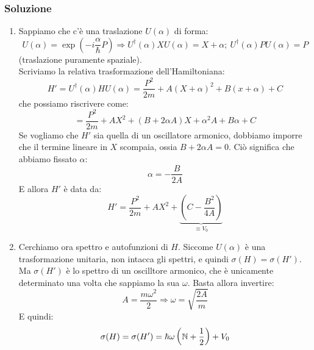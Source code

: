 \documentclass[../../FisicaTeorica.tex]{subfiles}
\begin{document}
\subsubsection{Soluzione}
\begin{enumerate}
\item Sappiamo che c'è una traslazione $U(\alpha)$ di forma:
\[
U(\alpha) =\exp\left(-i\frac{\alpha}{\hbar}P\right)\Rightarrow U^\dag (\alpha)XU(\alpha) = X+\alpha; \> U^\dag (\alpha)PU(\alpha) = P
\]
(traslazione puramente spaziale).\\
Scriviamo la relativa trasformazione dell'Hamiltoniana:
\[
H' = U^\dag(\alpha)HU(\alpha) = \frac{P^2}{2m}+ A(X+\alpha)^2 + B(x+\alpha) + C
\]
che possiamo riscrivere come:
\[
=\frac{P^2}{2m} + AX^2 + (B+2\alpha A)X + \alpha^2 A + B\alpha +C
\]
Se vogliamo che $H'$ sia quella di un oscillatore armonico, dobbiamo imporre che il termine lineare in $X$ scompaia, ossia $B+2\alpha A = 0$. Ciò significa che abbiamo fissato $\alpha$:
\[
\alpha = -\frac{B}{2A}
\]
E allora $H'$ è data da:
\[
H' = \frac{P^2}{2m} + AX^2 + \underbrace{\left(C-\frac{B^2}{4A}\right)}_{\equiv V_0}
\]
\item Cerchiamo ora spettro e autofunzioni di $H$. Siccome $U(\alpha)$ è una trasformazione unitaria, non intacca gli spettri, e quindi $\sigma(H)=\sigma(H')$. Ma $\sigma(H')$ è lo spettro di un oscilltore armonico, che è unicamente determinato una volta che sappiamo la sua $\omega$. Basta allora invertire:
\[
A=\frac{m\omega^2}{2}\Rightarrow \omega = \sqrt{\frac{2A}{m}}
\]
E quindi:
\[
\sigma(H) = \sigma(H') = \hbar \omega\left(\mathbb{N}+\frac{1}{2}\right) + V_0
\]


\end{enumerate}
\end{document}
